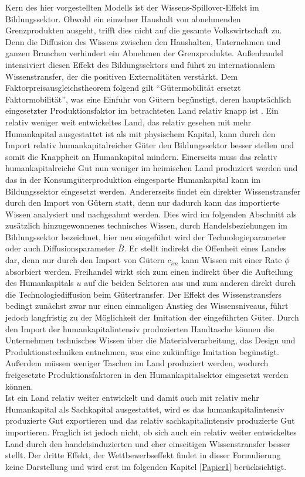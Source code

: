 Kern des hier vorgestellten Modells ist der Wissens-Spillover-Effekt im Bildungssektor. Obwohl ein einzelner Haushalt von abnehmenden Grenzprodukten ausgeht, trifft dies nicht auf die gesamte Volkswirtschaft zu. Denn die Diffusion des Wissens zwischen den Haushalten, Unternehmen und ganzen Branchen verhindert ein Abnehmen der Grenzprodukte. Außenhandel intensiviert diesen Effekt des Bildungssektors und führt zu internationalem Wissenstransfer, der die positiven Externalitäten verstärkt. Dem Faktorpreisausgleichstheorem folgend gilt "`Gütermobilität ersetzt Faktormobilität"', was  eine Einfuhr von Gütern begünstigt, deren hauptsächlich eingesetzter Produktionsfaktor im betrachteten Land relativ knapp ist \cite{Samuelson.1941}. Ein relativ weniger weit entwickeltes Land, das relativ gesehen mit mehr Humankapital ausgestattet ist als mit physischem Kapital, kann durch den Import relativ humankapitalreicher Güter den Bildungssektor besser stellen und somit die Knappheit an Humankapital mindern. Einerseits muss das relativ humankapitalreiche Gut nun weniger im heimischen Land produziert werden und das in der Konsumgüterproduktion eingesparte Humankapital kann im Bildungssektor eingesetzt werden. Andererseits findet ein direkter Wissenstransfer durch den Import von Gütern statt, denn nur dadurch kann das importierte Wissen analysiert und nachgeahmt werden. Dies wird im folgenden Abschnitt als zusätzlich hinzugewonnenes technisches Wissen, durch Handelsbeziehungen im Bildungssektor bezeichnet, hier neu eingeführt wird der Technologieparameter oder auch Diffusionsparameter $\bar{B}$. Er stellt indirekt die Offenheit eines Landes dar, denn nur durch den Import von Gütern $c_{im}$ kann Wissen mit einer Rate $\phi$ absorbiert werden. Freihandel wirkt sich zum einen indirekt über die Aufteilung des Humankapitals $u$ auf die beiden Sektoren aus und zum anderen direkt durch die Technologiediffusion beim Gütertransfer. Der Effekt des Wissenstransfers bedingt zunächst zwar nur einen einmaligen Anstieg des Wissensniveaus, führt jedoch langfristig zu der Möglichkeit der Imitation der eingeführten Güter. Durch den Import der humankapitalintensiv produzierten Handtasche können die Unternehmen technisches Wissen über die Materialverarbeitung, das Design und Produktionstechniken entnehmen, was eine zukünftige Imitation begünstigt. Außerdem müssen weniger Taschen im Land produziert werden, wodurch freigesetzte Produktionsfaktoren in den Humankapitalsektor eingesetzt werden können.\\
%
Ist ein Land relativ weiter entwickelt und damit auch mit relativ mehr Humankapital als Sachkapital ausgestattet, wird es das humankapitalintensiv produzierte Gut exportieren und das relativ sachkapitalintensiv produzierte Gut importieren. Fraglich ist jedoch nicht, ob sich auch ein relativ weiter entwickeltes Land durch den handelsinduzierten und eher einseitigen Wissenstransfer besser stellt. 
%
%
Der dritte Effekt, der Wettbewerbseffekt findet in dieser Formulierung keine Darstellung und wird erst im folgenden Kapitel \ref{Papier1} berücksichtigt. 
%
